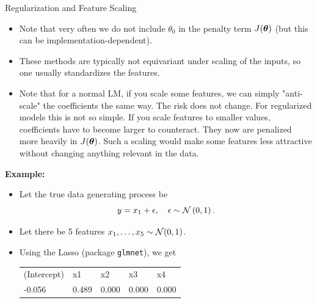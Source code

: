 \documentclass[11pt,compress,t,notes=noshow, xcolor=table]{beamer}
\begin{document}
\begin{vbframe}{Regularization and Feature Scaling}

  \begin{itemize}
    \item Note that very often we do not include $\theta_0$ in the penalty term $J(\bm{\theta})$ (but this can be implementation-dependent).
    \item These methods are typically not equivariant under scaling of the inputs, so one usually standardizes the features. 
    \item Note that for a normal LM, if you scale some features, we can simply "anti-scale" the coefficients the same way. The risk does not change. For regularized models this is not so simple. If you scale features to smaller values, coefficients have to become larger to counteract. They now are penalized more heavily in $J(\bm{\theta})$. Such a scaling would make some features less attractive without changing anything relevant in the data.
      
  \end{itemize}

\framebreak

\textbf{Example:}
\begin{itemize}
\item Let the true data generating process be
$$ y = x_1 + \epsilon, \quad \epsilon \sim \mathcal{N} \left(0, 1\right).$$
\item Let there be 5 features $x_1, \ldots, x_5 \sim \mathcal{N} (0,1)$.
\item Using the Lasso (package \texttt{glmnet}), we get
\footnotesize
\vspace{0.2cm}

\begin{table}[]
\begin{tabular}{lllll}
(Intercept) & x1    & x2    & x3    & x4    \\
-0.056      & 0.489 & 0.000 & 0.000 & 0.000 
\end{tabular}
\end{table}



\end{itemize}
\end{vbframe}
\end{document}
